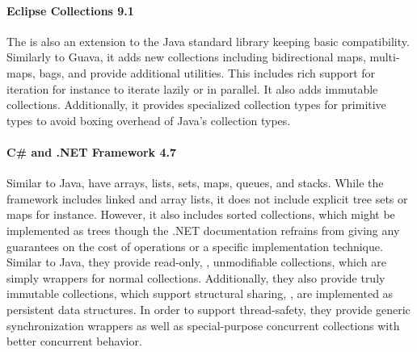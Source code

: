 \documentclass[sigconf, 10pt]{acmart}
\begin{document}
\paragraph{Eclipse Collections 9.1}

The 
is also an extension to the Java standard library keeping basic compatibility.
Similarly to Guava, it adds new collections
including bidirectional maps, multi-maps, bags,
and provide additional utilities.
This includes rich support for iteration
for instance to iterate lazily or in parallel.
It also adds immutable collections.
Additionally, it provides specialized collection types for primitive types
to avoid boxing overhead of Java's collection types.

\paragraph{C\# and .NET Framework 4.7}

Similar to Java, 
have arrays, lists, sets, maps, queues, and stacks.
While the framework includes linked and array lists,
it does not include explicit tree sets or maps for instance.
However, it also includes sorted collections,
which might be implemented as trees though the .NET documentation refrains from
giving any guarantees on the cost of operations
or a specific implementation technique.
Similar to Java, they provide read-only, \ie, unmodifiable collections,
which are simply wrappers for normal collections.
Additionally, they also provide truly immutable collections,
which support structural sharing, \ie,
are implemented as persistent data structures.
In order to support thread-safety,
they provide generic synchronization wrappers
as well as special-purpose concurrent collections
with better concurrent behavior.
\end{document}
